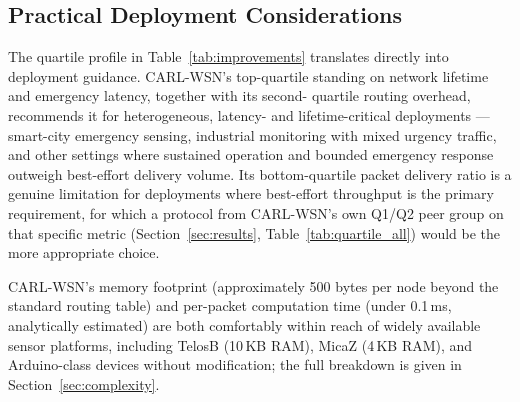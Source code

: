 \documentclass[12pt]{article}
\begin{document}
\subsection{Practical Deployment Considerations}

The quartile profile in Table~\ref{tab:improvements} translates
directly into deployment guidance. CARL-WSN's top-quartile standing
on network lifetime and emergency latency, together with its second-
quartile routing overhead, recommends it for heterogeneous,
latency- and lifetime-critical deployments --- smart-city emergency
sensing, industrial monitoring with mixed urgency traffic, and other
settings where sustained operation and bounded emergency response
outweigh best-effort delivery volume. Its bottom-quartile packet
delivery ratio is a genuine limitation for deployments where
best-effort throughput is the primary requirement, for which a
protocol from CARL-WSN's own Q1/Q2 peer group on that specific
metric (Section~\ref{sec:results}, Table~\ref{tab:quartile_all})
would be the more appropriate choice.

CARL-WSN's memory footprint (approximately 500 bytes per node beyond
the standard routing table) and per-packet computation time (under
0.1\,ms, analytically estimated) are both comfortably within reach
of widely available sensor platforms, including TelosB (10\,KB RAM),
MicaZ (4\,KB RAM), and Arduino-class devices without modification;
the full breakdown is given in Section~\ref{sec:complexity}.
\end{document}

